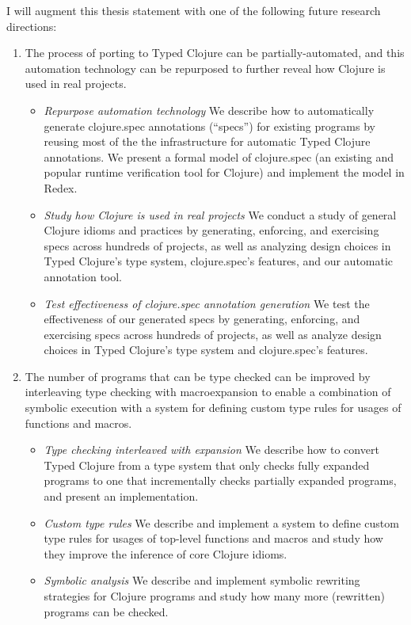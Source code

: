I will augment this thesis statement with one of the following future research directions:

\begin{enumerate}
  \item The process of porting to Typed Clojure can be partially-automated, and this automation technology can be repurposed to further reveal how Clojure is used in real projects.
    \begin{itemize}
      \item \emph{Repurpose automation technology}
        We describe how to automatically generate clojure.spec annotations (``specs'') for existing programs by reusing
        most of the the infrastructure for automatic Typed Clojure annotations.
        We present a formal model of clojure.spec (an existing and popular runtime verification tool for Clojure)
        and implement the model in Redex.
      \item \emph{Study how Clojure is used in real projects}
        We conduct a study of general Clojure idioms and practices by generating, enforcing, and exercising specs
        across hundreds of projects, as well as analyzing design choices in Typed Clojure's type system,
        clojure.spec's features, and our automatic annotation tool.
      \item \emph{Test effectiveness of clojure.spec annotation generation}
        We test the effectiveness of our generated specs by generating, enforcing, and exercising specs
        across hundreds of projects, as well as analyze design choices in Typed Clojure's type system and
        clojure.spec's features.
    \end{itemize}
  \item The number of programs that can be type checked can be improved by
    interleaving type checking with macroexpansion to enable a combination of
    symbolic execution with a system for defining custom type rules for usages of functions and macros.
    \begin{itemize}
      \item \emph{Type checking interleaved with expansion}
        We describe how to convert Typed Clojure from a type system that only checks fully
        expanded programs to one that incrementally
        checks partially expanded programs, and present an implementation.
      \item \emph{Custom type rules}
        We describe and implement a system to define custom type rules
        for usages of top-level functions and macros
        and study how they improve the inference of core Clojure idioms.
      \item \emph{Symbolic analysis}
        We describe and implement symbolic rewriting strategies for Clojure
        programs and study how many more (rewritten) programs can be checked.
    \end{itemize}
\end{enumerate}

